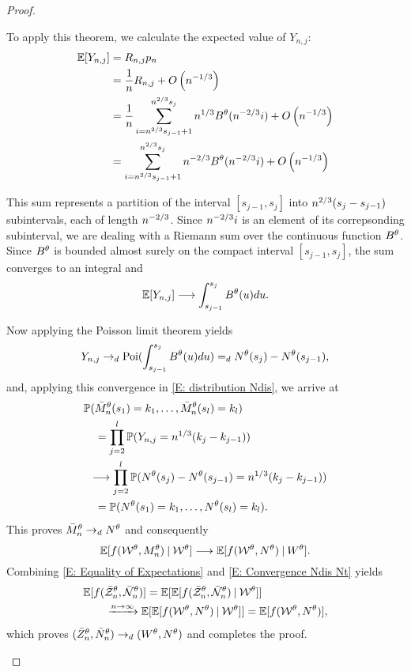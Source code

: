 \begin{proof}
\begin{proofpart}
To apply this theorem, we calculate the expected value of $Y_{n,j}$:
\begin{align*}
\mathbb{E}[Y_{n,j}] 
&= R_{n,j} p_n \\
&= \frac{1}{n} R_{n,j} + O\left(n^{-1 / 3}\right)\\
&= \frac{1}{n} \sum_{i=n^{2 / 3}s_{j-1}+1}^{n^{2 / 3}s_j}n^{1 / 3}B^{\theta}(n^{-2 / 3}i) + O\left(n^{-1 / 3}\right)\\
&= \sum_{i=n^{2 / 3}s_{j-1}+1}^{n^{2 / 3}s_j}n^{-2 / 3}B^{\theta}(n^{-2 / 3}i) + O\left(n^{-1 / 3}\right)
\end{align*}

This sum represents a partition of the interval $[s_{j-1}, s_j]$ into $n^{2 / 3}(s_j - s_{j-1})$ subintervals, each of length $n^{-2 / 3}$.
Since $n^{-2 / 3}i$ is an element of its correpsonding subinterval, 
we are dealing with a Riemann sum over the continuous function $B^{\theta}$.
Since $B^{\theta}$ is bounded almost surely on the compact interval $[s_{j-1}, s_j]$,
the sum converges to an integral and
\begin{equation}
\mathbb{E}[Y_{n,j}] \longrightarrow \int_{s_{j-1}}^{s_j} B^{\theta}(u)du.
\end{equation}

Now applying the Poisson limit theorem yields
\begin{equation} \label{E: convergence dist Yj}
Y_{n,j} \rightarrow_d \operatorname*{Poi}( \int_{s_{j-1}}^{s_j} B^{\theta}(u)du ) =_d N^{\theta}(s_j) - N^{\theta}(s_{j-1}),
\end{equation}
and, applying this convergence in \eqref{E: distribution Ndis}, we arrive at
\begin{equation*}
\begin{aligned}
&\mathbb{P}(\bar{M}_n^{\theta}(s_1) = k_1, \dots, \bar{M}_n^{\theta}(s_l) = k_l) \\
&\quad = \prod_{j=2}^{l} \mathbb{P}( Y_{n,j} = n^{1 / 3}(k_j - k_{j-1}) ) \\
&\enspace \longrightarrow \prod_{j=2}^{l} \mathbb{P}( N^{\theta}(s_j) - N^{\theta}(s_{j-1}) = n^{1 / 3}(k_j - k_{j-1}) ) \\
&\quad = \mathbb{P}(N^{\theta}(s_1) = k_1, \dots, N^{\theta}(s_l) = k_l).
\end{aligned}
\end{equation*}
This proves $\bar{M}_n^{\theta} \rightarrow_d N^{\theta}$ and consequently
\begin{equation} \label{E: Convergence Ndis Nt}
	\mathbb{E}[f(\mathcal{W}^{\theta}, M_n^{\theta}) \: | \: \mathcal{W}^{\theta}] \longrightarrow \mathbb{E}[f(\mathcal{W}^{\theta}, N^{\theta}) \: | \: W^{\theta}].
\end{equation}
Combining \eqref{E: Equality of Expectations} and \eqref{E: Convergence Ndis Nt} yields
\begin{equation}
\begin{aligned}
&\mathbb{E}[f(\bar{\mathcal{Z}}^{\theta}_n, \bar{\mathcal{N}}_n^{\theta})] = \mathbb{E}[\mathbb{E}[f(\bar{\mathcal{Z}}^{\theta}_n, \bar{\mathcal{N}}_n^{\theta}) \: | \: \mathcal{W}^{\theta}]] \\
&\qquad \xrightarrow{n \rightarrow \infty} \mathbb{E}[\mathbb{E}[f(\mathcal{W}^{\theta}, N^{\theta}) \: | \: \mathcal{W}^{\theta}]] = \mathbb{E}[f(\mathcal{W}^{\theta}, N^{\theta})],
\end{aligned}
\end{equation}
which proves $(\bar{Z}^{\theta}_n, \bar{N}_n^{\theta}) \rightarrow_d (W^{\theta}, N^{\theta})$ and completes the proof.
\end{proofpart}
\end{proof}


